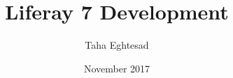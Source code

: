 \documentclass{article}
\title{Liferay 7 Development}
\author{Taha Eghtesad}
\date{November 2017}
\begin{document}
\sffamily


\tableofcontents








\end{document}

